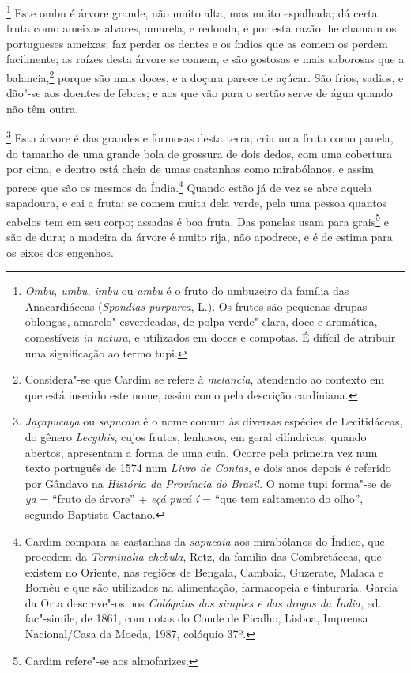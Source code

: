 \begin{linenumbers}
\footnote{ \textit{Ombu, umbu, imbu} ou \textit{ambu} é
o fruto do umbuzeiro da família das Anacardiáceas (\textit{Spondias
purpurea}, L.). Os frutos são pequenas drupas oblongas,
amarelo"-esverdeadas, de polpa verde"-clara, doce e aromática,
comestíveis \textit{in natura}, e utilizados em doces e compotas. É
difícil de atribuir uma significação ao termo tupi.} Este
ombu é árvore grande, não muito alta, mas muito espalhada; dá certa
fruta como ameixas alvares, amarela, e redonda, e por esta razão lhe
chamam os portugueses ameixas; faz perder os dentes e os índios que as
comem os perdem facilmente; as raízes desta árvore se comem, e são
gostosas e mais saborosas que a balancia,\footnote{ Considera"-se que
Cardim se refere à \textit{melancia}, atendendo ao contexto em que está
inserido este nome, assim como pela descrição cardiniana.} porque
são mais doces, e a doçura parece de açúcar. São frios, sadios, e
dão"-se aos doentes de febres; e aos que vão para o sertão serve de água
quando não têm outra. 

\footnote{ \textit{Jaçapucaya} ou \textit{sapucaia} 
é o nome comum às diversas espécies de Lecitidáceas, do gênero
\textit{Lecythis}, cujos frutos, lenhosos, em geral cilíndricos, quando
abertos, apresentam a forma de uma cuia. Ocorre pela primeira vez num
texto português de 1574 num \textit{Livro de Contas}, e dois anos
depois é referido por Gândavo na \textit{História da Província do
Brasil.} O nome tupi forma"-se de \textit{ya} = ``fruto de árvore'' +
\textit{eçá pucá í} = ``que tem saltamento do olho'', segundo Baptista
Caetano.} Esta árvore é das grandes e formosas desta terra;
cria uma fruta como panela, do tamanho de uma grande bola de grossura
de dois dedos, com uma cobertura por cima, e dentro está cheia de umas
castanhas como mirabólanos, e assim parece que são os mesmos da
Índia.\footnote{ Cardim compara as castanhas da \textit{sapucaia} aos
mirabólanos do Índico, que procedem da \textit{Terminalia chebula}, 
Retz, da família das Combretáceas, que existem no Oriente, nas regiões
de Bengala, Cambaia, Guzerate, Malaca e Bornéu e que são utilizados na
alimentação, farmacopeia e tinturaria. Garcia da Orta descreve"-os nos
\textit{Colóquios dos simples e das drogas da Índia}, ed. fac"-simile,
de 1861, com notas do Conde de Ficalho, Lisboa, Imprensa Nacional/Casa da Moeda, 1987, colóquio 37º.} Quando estão já de vez se abre
aquela sapadoura, e cai a fruta; se comem muita dela verde, pela uma
pessoa quantos cabelos tem em seu corpo; assadas é boa fruta. Das
panelas usam para grais\footnote{ Cardim refere"-se aos almofarizes.} e
são de dura; a madeira da árvore é muito rija, não apodrece, e é de
estima para os eixos dos engenhos.


\end{linenumbers}
